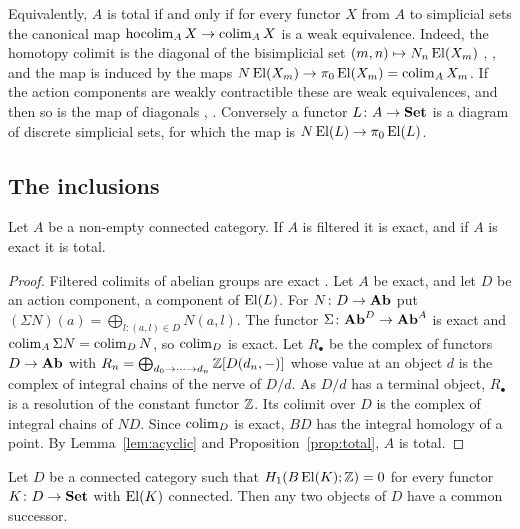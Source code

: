 \begin{remark}\label{rem:hocolim}
Equivalently, $A$ is total if and only if for every functor $X$ from $A$ to
simplicial sets the canonical map $\operatorname{hocolim}_AX\to\operatorname{colim}_AX$ is a
weak equivalence. Indeed, the homotopy colimit is the diagonal of the
bisimplicial set $(m,n)\mapsto N_n\operatorname{El}(X_m)$ \cite[Chapter~XII]{BK}, \cite[Sections~21 and~22]{JardineL8}, and the map
is induced by the maps $N\operatorname{El}(X_m)\to\pi_0\operatorname{El}(X_m)=\operatorname{colim}_AX_m$. If the action
components are weakly contractible these are weak equivalences, and then so is
the map of diagonals \cite[Lemma~21.1]{JardineL8}, \cite[Chapter~IV]{GJ}. Conversely a functor
$L\colon A\to\mathbf{Set}$ is a diagram of discrete simplicial sets, for which the map
is $N\operatorname{El}(L)\to\pi_0\operatorname{El}(L)$.
\end{remark}

\subsection{The inclusions}

\begin{proposition}\label{prop:incl}
Let $A$ be a non-empty connected category. If $A$ is filtered it is exact,
and if $A$ is exact it is total.
\end{proposition}

\begin{proof}
Filtered colimits of abelian groups are exact
\cite[Section~2.6]{Weibel}. Let $A$ be exact, and let $D$ be an action
component, a component of $\operatorname{El}(L)$. For $N\colon D\to\mathbf{Ab}$ put
$(\Sigma N)(a)=\bigoplus_{l:(a,l)\in D}N(a,l)$. The functor
$\Sigma\colon\mathbf{Ab}^D\to\mathbf{Ab}^A$ is exact and $\operatorname{colim}_A\Sigma N=\operatorname{colim}_DN$, so
$\operatorname{colim}_D$ is exact. Let $R_\bullet$ be the complex of functors $D\to\mathbf{Ab}$
with $R_n=\bigoplus_{d_0\to\dots\to d_n}\mathbb{Z}[D(d_n,-)]$ whose value at an object
$d$ is the complex of integral chains of the nerve of $D/d$. As $D/d$ has a
terminal object, $R_\bullet$ is a resolution of the constant functor $\mathbb{Z}$.
Its colimit over $D$ is the complex of integral chains of $ND$. Since
$\operatorname{colim}_D$ is exact, $BD$ has the integral homology of a point. By
Lemma~\ref{lem:acyclic} and Proposition~\ref{prop:total}, $A$ is total.
\end{proof}

\begin{lemma}\label{lem:succ}
Let $D$ be a connected category such that $H_1(B\operatorname{El}(K);\mathbb{Z})=0$ for every
functor $K\colon D\to\mathbf{Set}$ with $\operatorname{El}(K)$ connected. Then any two objects of
$D$ have a common successor.
\end{lemma}

